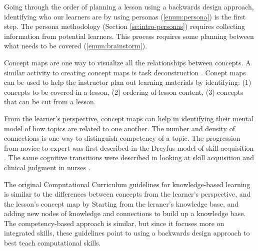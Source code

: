\documentclass[010-intro.tex]{subfiles}
\begin{document}
        Going through the order of planning a lesson using a backwards design approach,
        identifying who our learners are by using personas (\ref{enum:persona}) is the first step.
        The persona methodology (Section \ref{se:intro-personas}) requires collecting information from potential
        learners.
        This process requires some planning between what needs to be covered (\ref{enum:brainstorm}).

        Concept maps are one way to visualize all the relationships between concepts.
        A similar activity to creating concept maps is task deconstruction
        \cite{Koch2016}.
        Conept maps can be used to
        help the instructor plan out learning materials by identifying:
        (1) concepts to be covered in a lesson,
        (2) ordering of lesson content,
        (3) concepts that can be cut from a lesson.

        From the learner's perspective, concept maps can help in identifying their mental model of how topics
        are related to one another.
        The number and density of connections is one way to distinguish competency of a topic.
        The progression from novice to expert was first described in the Dreyfus model of skill acquisition
        \cite{dreyfus1980five, bennerUsingDreyfusModel2004}.
        The same cognitive transitions were described in looking at skill acquisition and clinical judgment in nurses
        \cite{bennerUsingDreyfusModel2004}.

        The original Computational Curriculum guidelines for knowledge-based learning is similar
        to the differences between concepts from the learner's perspective, and the lesson's concept map
        by Starting from the leraner's knowledge base, and adding new nodes of knowledge and connections to build up a knowledge base.
        The competency-based approach is similar, but since it focuses more on integrated skills,
        these guidelines point to using a backwards design approach to best teach computational skills.
\end{document}
